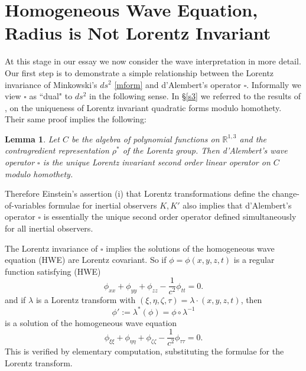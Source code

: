 \documentclass[12pt]{article}
\newtheorem*{lem}{Lemma}
\newcommand{\bR}{\mathbb{R}}
\newcommand{\del}{\partial}
\begin{document}

\section{Homogeneous Wave Equation, Radius is Not Lorentz Invariant}\label{wes}

At this stage in our essay we now consider the wave interpretation in more detail. Our first step is to demonstrate a simple relationship between the Lorentz invariance of Minkowski's $ds^2$ \eqref{mform} and d'Alembert's operator $\square$. Informally we view $\square$ as ``dual" to $ds^2$ in the following sense. In \S\ref{s3} we referred to the results of \cite{elton2010indefinite}, \cite{arminjon2018lorentz} on the uniqueness of Lorentz invariant quadratic forms modulo homothety. Their same proof implies the following:

\begin{lem}
Let $C$ be the algebra of polynomial functions on $\bR^{1,3}$ and the contragredient representation $\rho^*$ of the Lorentz group. Then d'Alembert's wave operator $\square$ is the unique Lorentz invariant second order linear operator on $C$ modulo homothety.
\end{lem}

Therefore Einstein's assertion (i) that Lorentz transformations define the change-of-variables formulae for inertial observers $K, K'$ also implies that d'Alembert's operator $\square$ is essentially the unique second order operator defined simultaneously for all inertial observers. 

The Lorentz invariance of $\square$ implies the solutions of the homogeneous wave equation (HWE) are Lorentz covariant. So if $\phi=\phi(x,y,z,t)$ is a regular function satisfying (HWE)
\begin{equation} \label{hw}
\phi_{xx}+\phi_{yy}+\phi_{zz}-\frac{1}{c^2}\phi_{tt}=0.
\end{equation} and if $\lambda$ is a Lorentz transform with $(\xi, \eta, \zeta, \tau)=\lambda \cdot (x,y,z,t)$, then $$\phi':=\lambda^*(\phi)=\phi\circ\lambda^{-1}$$ is a solution of the homogeneous wave equation $$\phi_{\xi \xi}+\phi_{\eta \eta}+\phi_{\zeta \zeta}-\frac{1}{c^2}\phi_{\tau \tau}=0.$$ This is verified by elementary computation, substituting the formulae for the Lorentz transform. 
\end{document}
